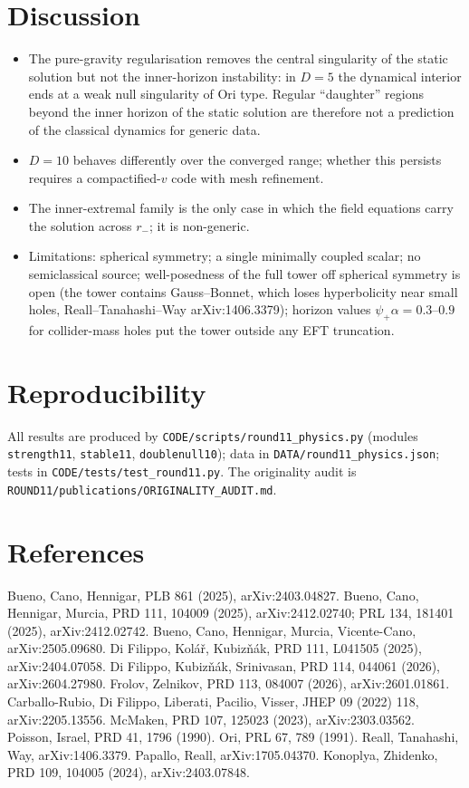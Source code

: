 \documentclass[11pt,a4paper]{article}
\theoremstyle{remark}\newtheorem{remark}[theorem]{Remark}
\begin{document}
\section{Discussion}
\begin{itemize}
\item The pure-gravity regularisation removes the central singularity of the static solution but not the inner-horizon instability:
in $D=5$ the dynamical interior ends at a weak null singularity of Ori type. Regular ``daughter'' regions beyond the inner horizon of
the static solution are therefore not a prediction of the classical dynamics for generic data.
\item $D=10$ behaves differently over the converged range; whether this persists requires a compactified-$v$ code with mesh refinement.
\item The inner-extremal family is the only case in which the field equations carry the solution across $r_-$; it is non-generic.
\item Limitations: spherical symmetry; a single minimally coupled scalar; no semiclassical source; well-posedness of the full tower
off spherical symmetry is open (the tower contains Gauss--Bonnet, which loses hyperbolicity near small holes, Reall--Tanahashi--Way
arXiv:1406.3379); horizon values $\psi_+\alpha=0.3$--$0.9$ for collider-mass holes put the tower outside any EFT truncation.
\end{itemize}

\section*{Reproducibility}
All results are produced by \texttt{CODE/scripts/round11\_physics.py} (modules \texttt{strength11}, \texttt{stable11},
\texttt{doublenull10}); data in \texttt{DATA/round11\_physics.json}; tests in \texttt{CODE/tests/test\_round11.py}. The originality
audit is \texttt{ROUND11/publications/ORIGINALITY\_AUDIT.md}.

\section*{References}
\small
Bueno, Cano, Hennigar, PLB 861 (2025), arXiv:2403.04827.
Bueno, Cano, Hennigar, Murcia, PRD 111, 104009 (2025), arXiv:2412.02740; PRL 134, 181401 (2025), arXiv:2412.02742.
Bueno, Cano, Hennigar, Murcia, Vicente-Cano, arXiv:2505.09680.
Di Filippo, Kol\'a\v{r}, Kubiz\v{n}\'ak, PRD 111, L041505 (2025), arXiv:2404.07058.
Di Filippo, Kubiz\v{n}\'ak, Srinivasan, PRD 114, 044061 (2026), arXiv:2604.27980.
Frolov, Zelnikov, PRD 113, 084007 (2026), arXiv:2601.01861.
Carballo-Rubio, Di Filippo, Liberati, Pacilio, Visser, JHEP 09 (2022) 118, arXiv:2205.13556.
McMaken, PRD 107, 125023 (2023), arXiv:2303.03562.
Poisson, Israel, PRD 41, 1796 (1990). Ori, PRL 67, 789 (1991).
Reall, Tanahashi, Way, arXiv:1406.3379. Papallo, Reall, arXiv:1705.04370.
Konoplya, Zhidenko, PRD 109, 104005 (2024), arXiv:2403.07848.
\end{document}
